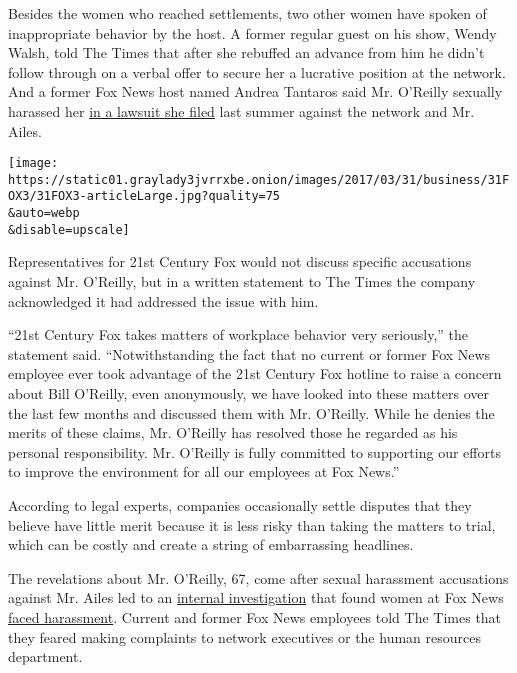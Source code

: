 Besides the women who reached settlements, two other women have spoken
of inappropriate behavior by the host. A former regular guest on his
show, Wendy Walsh, told The Times that after she rebuffed an advance
from him he didn't follow through on a verbal offer to secure her a
lucrative position at the network. And a former Fox News host named
Andrea Tantaros said Mr. O'Reilly sexually harassed her
\href{https://www.nytimes3xbfgragh.onion/2016/08/23/business/media/andrea-tantaros-of-fox-news-claims-retaliation-for-harassment-complaints.html}{in
a lawsuit she filed} last summer against the network and Mr. Ailes.

\texttt{[image: https://static01.graylady3jvrrxbe.onion/images/2017/03/31/business/31FOX3/31FOX3-articleLarge.jpg?quality=75\\\&auto=webp\\\&disable=upscale]}

Representatives for 21st Century Fox would not discuss specific
accusations against Mr. O'Reilly, but in a written statement to The
Times the company acknowledged it had addressed the issue with him.

``21st Century Fox takes matters of workplace behavior very seriously,''
the statement said. ``Notwithstanding the fact that no current or former
Fox News employee ever took advantage of the 21st Century Fox hotline to
raise a concern about Bill O'Reilly, even anonymously, we have looked
into these matters over the last few months and discussed them with Mr.
O'Reilly. While he denies the merits of these claims, Mr. O'Reilly has
resolved those he regarded as his personal responsibility. Mr. O'Reilly
is fully committed to supporting our efforts to improve the environment
for all our employees at Fox News.''

According to legal experts, companies occasionally settle disputes that
they believe have little merit because it is less risky than taking the
matters to trial, which can be costly and create a string of
embarrassing headlines.

The revelations about Mr. O'Reilly, 67, come after sexual harassment
accusations against Mr. Ailes led to an
\href{https://www.nytimes3xbfgragh.onion/2016/07/21/business/media/as-an-internal-inquiry-sinks-ailes-questions-about-fox-newss-fate.html}{internal
investigation} that found women at Fox News
\href{https://www.nytimes3xbfgragh.onion/2016/07/24/business/at-fox-news-kisses-innuendo-propositions-and-fears-of-reprisal.html}{faced
harassment}. Current and former Fox News employees told The Times that
they feared making complaints to network executives or the human
resources department.


